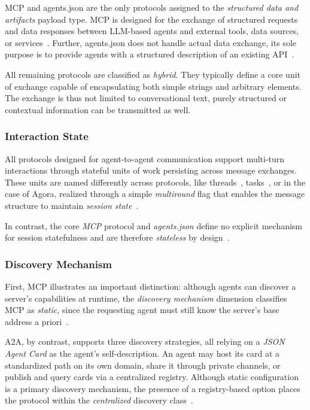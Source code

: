 \documentclass[pdflatex,sn-mathphys-num]{sn-jnl}%
\theoremstyle{thmstyleone}%
\theoremstyle{thmstyletwo}%
\theoremstyle{thmstylethree}%
\begin{document}
MCP and agents.json are the only protocols assigned to the \textit{structured data and artifacts} payload type. MCP is designed for the exchange of structured requests and data responses between LLM-based agents and external tools, data sources, or services~\cite{mcpdocscorearchitecture}. Further, agents.json does not handle actual data exchange, its sole purpose is to provide agents with a structured description of an existing API~\cite{agentsjsonintro}. 

All remaining protocols are classified as \textit{hybrid}. They typically define a core unit of exchange capable of encapsulating both simple strings and arbitrary elements. The exchange is thus not limited to conversational text, purely structured or contextual information can be transmitted as well.

\subsubsection{Interaction State}

All protocols designed for agent-to-agent communication support multi-turn interactions through stateful units of work persisting across message exchanges. These units are named differently across protocols, like threads~\cite{agntcythreads,lapdocsapi}, tasks~\cite{a2adocskeyconcepts}, or in the case of Agora, realized through a simple \textit{multiround} flag that enables the message structure to maintain \textit{session state}~\cite{agoraspecification}.

In contrast, the core \textit{MCP} protocol and \textit{agents.json} define no explicit mechanism for session statefulness and are therefore \textit{stateless} by design~\cite{mcpdocscorearchitecture,agentsjsonintro,agentsjsonschema}.

\subsubsection{Discovery Mechanism}

First, MCP illustrates an important distinction: although agents can discover a server's capabilities at runtime, the \textit{discovery mechanism} dimension classifies MCP as \textit{static}, since the requesting agent must still know the server's base address a priori~\cite{mcpdocscorearchitecture}.

A2A, by contrast, supports three discovery strategies, all relying on a \textit{JSON Agent Card} as the agent's self-description. An agent may host its card at a standardized path on its own domain, share it through private channels, or publish and query cards via a centralized registry. Although static configuration is a primary discovery mechanism, the presence of a registry-based option places the protocol within the \textit{centralized} discovery class~\cite{a2adocsspecification}.
\end{document}
